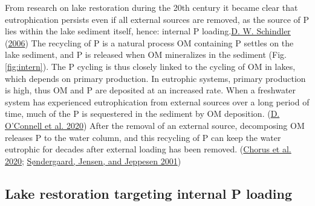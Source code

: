 \documentclass[a4paper,11pt]{article}
\begin{document}
From research on lake restoration during the 20th century it became clear that eutrophication persists even if all external sources are removed, as the source of P lies within the lake sediment itself, hence: internal P loading.\protect\hyperlink{ref-schindlerRecentAdvancesUnderstanding2006}{D. W. Schindler} (\protect\hyperlink{ref-schindlerRecentAdvancesUnderstanding2006}{2006}) The recycling of P is a natural process OM containing P settles on the lake sediment, and P is released when OM mineralizes in the sediment (Fig. \ref{fig:intern}). The P cycling is thus closely linked to the cycling of OM in lakes, which depends on primary production. In eutrophic systems, primary production is high, thus OM and P are deposited at an increased rate. When a freshwater system has experienced eutrophication from external sources over a long period of time, much of the P is sequestered in the sediment by OM deposition. (\protect\hyperlink{ref-oconnellChangesSedimentaryPhosphorus2020}{D. O'Connell et al. 2020}) After the removal of an external source, decomposing OM releases P to the water column, and this recycling of P can keep the water eutrophic for decades after external loading has been removed. (\protect\hyperlink{ref-chorusDecadesNeededEcosystem2020}{Chorus et al. 2020}; \protect\hyperlink{ref-sondergaardRetentionInternalLoading2001}{Søndergaard, Jensen, and Jeppesen 2001})

\hypertarget{lake-restoration-targeting-internal-p-loading}{%
\subsection{Lake restoration targeting internal P loading}\label{lake-restoration-targeting-internal-p-loading}}
\end{document}
